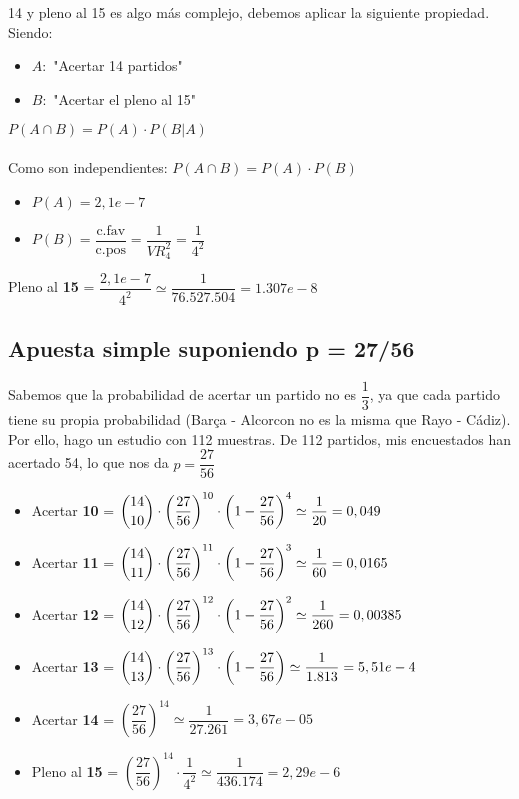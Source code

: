 \documentclass{article}
\begin{document}
14 y pleno al 15 es algo más complejo, debemos aplicar la siguiente propiedad. Siendo:

\begin{itemize}
    \item $A:$ "Acertar 14 partidos"
    \item $B:$ "Acertar el pleno al 15"
\end{itemize}
$P(A \cap B) = P(A) \cdot P(B | A)$ \\\\
Como son independientes: $P(A \cap B) = P(A) \cdot P(B)$
\begin{itemize}
    \item $P(A) = 2,1e-7$
    \item $P(B) = \dfrac{\text{c.fav}}{\text{c.pos}} = \dfrac{1}{VR_{4}^{2}} = \dfrac{1}{4^2}$
\end{itemize}

Pleno al \textbf{15} = $\dfrac{2,1e-7}{4^2} \simeq \dfrac{1}{76.527.504} = 1.307e-8$

\subsection{Apuesta simple suponiendo p = 27/56}
Sabemos que la probabilidad de acertar un partido no es $\dfrac{1}{3}$, ya que cada partido tiene su propia probabilidad (Barça - Alcorcon no es la misma que Rayo - Cádiz). Por ello, hago un estudio con 112 muestras. De 112 partidos, mis encuestados han acertado 54, lo que nos da $p = \dfrac{27}{56}$

\begin{itemize}
    \item Acertar \textbf{10} = $\dbinom{14}{10} \cdot \left(\dfrac{27}{56}\right)^{10} \cdot \left(1-\dfrac{27}{56}\right)^{4} \simeq \dfrac{1}{20} = 0,049$
    \item Acertar \textbf{11} = $\dbinom{14}{11} \cdot \left(\dfrac{27}{56}\right)^{11} \cdot \left(1-\dfrac{27}{56}\right)^3 \simeq \dfrac{1}{60} = 0,0165$ 
    \item Acertar \textbf{12} = $\dbinom{14}{12} \cdot \left(\dfrac{27}{56}\right)^{12} \cdot \left(1-\dfrac{27}{56}\right)^2 \simeq \dfrac{1}{260} = 0,00385 $  
    \item Acertar \textbf{13} = $\dbinom{14}{13} \cdot \left(\dfrac{27}{56}\right)^{13} \cdot \left(1-\dfrac{27}{56}\right) \simeq \dfrac{1}{1.813} = 5,51e-4 $ 
    \item Acertar \textbf{14} = $\left(\dfrac{27}{56}\right)^{14} \simeq \dfrac{1}{27.261} = 3,67e-05 $
    \item Pleno al \textbf{15} = $\left(\dfrac{27}{56}\right)^{14} \cdot \dfrac{1}
    {4^2}  \simeq \dfrac{1}{436.174} = 2,29e-6
 $
\end{itemize}
\end{document}
